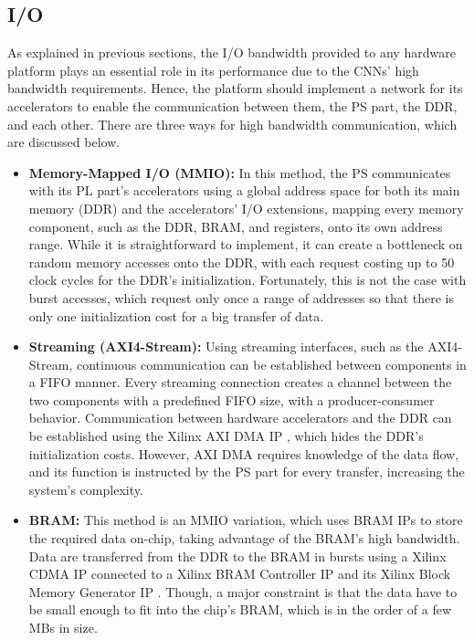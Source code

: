 \subsection{I/O}
\label{sec:IO}
As explained in previous sections, the I/O bandwidth provided to any hardware platform plays an essential role in its performance due to the CNNs' high bandwidth requirements. Hence, the platform should implement a network for its accelerators to enable the communication between them, the PS part, the DDR, and each other. There are three ways for high bandwidth communication, which are discussed below.
\begin{itemize}
	\item \textbf{Memory-Mapped I/O (MMIO):} In this method, the PS communicates with its PL part's accelerators using a global address space for both its main memory (DDR) and the accelerators' I/O extensions, mapping every memory component, such as the DDR, BRAM, and registers, onto its own address range. While it is straightforward to implement, it can create a bottleneck on random memory accesses onto the DDR, with each request costing up to 50 clock cycles for the DDR's initialization. Fortunately, this is not the case with burst accesses, which request only once a range of addresses so that there is only one initialization cost for a big transfer of data.
	\item \textbf{Streaming (AXI4-Stream):} Using streaming interfaces, such as the AXI4-Stream, continuous communication can be established between components in a FIFO manner. Every streaming connection creates a channel between the two components with a predefined FIFO size, with a producer-consumer behavior. Communication between hardware accelerators and the DDR can be established using the Xilinx AXI DMA IP \cite{PG021-AXI-DMA-Product-Guide}, which hides the DDR's initialization costs. However, AXI DMA requires knowledge of the data flow, and its function is instructed by the PS part for every transfer, increasing the system's complexity.
	\item \textbf{BRAM:} This method is an MMIO variation, which uses BRAM IPs to store the required data on-chip, taking advantage of the BRAM's high bandwidth. Data are transferred from the DDR to the BRAM in bursts using a Xilinx CDMA IP \cite{PG034-AXI-Central-Direct-Memory-Access-Product-Guide} connected to a Xilinx BRAM Controller IP \cite{PG078-AXI-BRAM-Controller-Product-Guide} and its Xilinx Block Memory Generator IP \cite{PG058-Block-Memory-Generator-Product-Guide}. Though, a major constraint is that the data have to be small enough to fit into the chip's BRAM, which is in the order of a few MBs in size.
\end{itemize}

